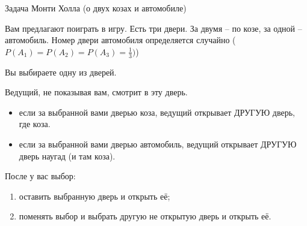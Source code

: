 \begin{frame}{Задача Монти Холла (о двух козах и автомобиле)}
\footnotesize

Вам предлагают поиграть в игру. Есть три двери. За двумя -- по козе, за одной -- автомобиль. 
Номер двери автомобиля определяется случайно ($P(A_1)=P(A_2)=P(A_3)=\frac{1}{3})$)

Вы выбираете одну из дверей.

Ведущий, не показывая вам, смотрит в эту дверь.
\begin{itemize}
	\item если за выбранной вами дверью коза, ведущий открывает ДРУГУЮ дверь, где коза.
	\item если за выбранной вами дверью автомобиль, ведущий открывает ДРУГУЮ дверь наугад (и там коза).
\end{itemize}

После у вас выбор:
\begin{enumerate}
	\item оставить выбранную дверь и открыть её;
	\item поменять выбор и выбрать другую не открытую дверь и открыть её.
\end{enumerate}

	
\end{frame}


